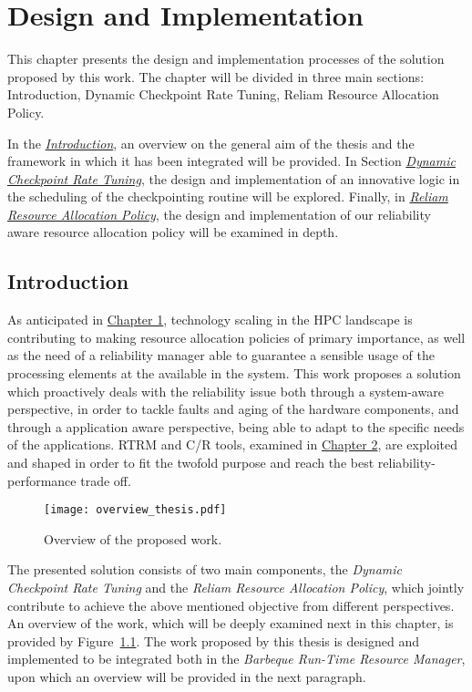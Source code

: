 %
%
\chapter{Design and Implementation}
%
%
\label{cap:implementation}
This chapter presents the design and implementation processes of the solution proposed by this work. The chapter will be divided in three main sections: Introduction, Dynamic Checkpoint Rate Tuning, Reliam Resource Allocation Policy.

In the {\hyperref[sec:introdes]{\emph{Introduction}}}, an overview on the general aim of the thesis and the framework in which it has been integrated will be provided. In Section {\hyperref[sec:dcrt]{\emph{Dynamic Checkpoint Rate Tuning}}}, the design and implementation of an innovative logic in the scheduling of the checkpointing routine will be explored. Finally, in {\hyperref[sec:reliam]{\emph{Reliam Resource Allocation Policy}}}, the design and implementation of our reliability aware resource allocation policy will be examined in depth.

\section{Introduction}
\label{sec:introdes}
As anticipated in {\hyperref[cap:introduction]{Chapter 1}}, technology scaling in the HPC landscape is contributing to making resource allocation policies of primary importance, as well as the need of a reliability manager able to guarantee a sensible usage of the processing elements at the available in the system. This work proposes a solution which proactively deals with the reliability issue both through a system-aware perspective, in order to tackle faults and aging of the hardware components, and through a application aware perspective, being able to adapt to the specific needs of the applications. RTRM and C/R tools, examined in {\hyperref[cap:stateofart]{Chapter 2}}, are exploited and shaped in order to fit the twofold purpose and reach the best reliability-performance trade off.

\begin{figure}[t]
    \centering
    \texttt{[image: overview\_thesis.pdf]}
    \caption{Overview of the proposed work.}
    \label{fig:overviewth}
\end{figure}

The presented solution consists of two main components, the \emph{Dynamic Checkpoint Rate Tuning} and the \emph{Reliam Resource Allocation Policy}, which jointly contribute to achieve the above mentioned objective from different perspectives. An overview of the work, which will be deeply examined next in this chapter, is provided by Figure~\ref{fig:overviewth}.
The work proposed by this thesis is designed and implemented to be integrated both in the \emph{Barbeque Run-Time Resource Manager}, upon which an overview will be provided in the next paragraph.

